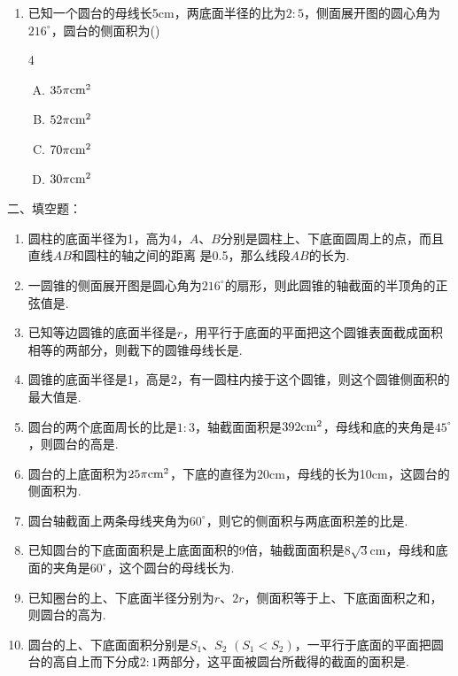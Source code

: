 \begin{enumerate}
\item 已知一个圆台的母线长5cm，两底面半径的比为$2:5$，侧面展开图的圆心角为$216^{\circ}$，圆台的侧面积为\hfill (\quad )
\begin{multicols}{4}
  \begin{enumerate}[(A)]
\item $35\pi {\rm cm^2}$
\item $52\pi {\rm cm^2}$
\item $70\pi {\rm cm^2}$
\item $30\pi {\rm cm^2}$
\end{enumerate}  
\end{multicols}
\end{enumerate}

二、填空题：
\begin{enumerate}
\item 圆柱的底面半径为1，高为4，$A$、$B$分别是圆柱上、下底面圆周上的点，而且直线$AB$和圆柱的轴之间的距离
是0.5，那么线段$AB$的长为\blank.
\item 一圆锥的侧面展开图是圆心角为$216^{\circ}$的扇形，则此圆锥的轴截面的半顶角的正弦值是\blank.
\item 已知等边圆锥的底面半径是$r$，用平行于底面的平面把这个圆锥表面截成面积相等的两部分，则截下的圆锥母线长是\blank.
\item 圆锥的底面半径是1，高是2，有一圆柱内接于这个圆锥，则这个圆锥侧面积的最大值是\blank.
\item 圆台的两个底面周长的比是$1:3$，轴截面面积是$392{\rm cm^2}$，母线和底的夹角是$45^{\circ}$，则圆台的高是\blank.
\item 圆台的上底面积为$25\pi{\rm cm^2}$，下底的直径为20cm，母线的长为10cm，这圆台的侧面积为\blank.
\item 圆台轴截面上两条母线夹角为$60^{\circ}$，则它的侧面积与两底面积差的比是\blank.
\item 已知圆台的下底面面积是上底面面积的9倍，轴截面面积是$8\sqrt{3}$cm，母线和底面的夹角是$60^{\circ}$，这个圆台的母线长为\blank.
\item 已知圈台的上、下底面半径分别为$r$、$2r$，侧面积等于上、下底面面积之和，则圆台的高为\blank.
\item 圆台的上、下底面面积分别是$S_1$、$S_2$ $(S_1<S_2)$，一平行于底面的平面把圆台的高自上而下分成$2:1$两部分，这平面被圆台所截得的截面的面积是\blank.
\end{enumerate}


